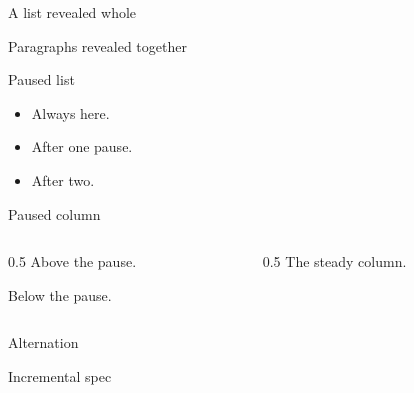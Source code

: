 \documentclass[aspectratio=169]{slides}
\begin{document}
\begin{frame}{A list revealed whole}
\end{frame}

\begin{frame}{Paragraphs revealed together}
\end{frame}

\begin{frame}{Paused list}
\begin{itemize}
\item Always here.
\pause
\item After one pause.
\pause
\item After two.
\end{itemize}
\end{frame}

\begin{frame}{Paused column}
\begin{columns}
\begin{column}{0.5\textwidth}
Above the pause.

\pause
Below the pause.
\end{column}
\begin{column}{0.5\textwidth}
The steady column.
\end{column}
\end{columns}
\end{frame}

\begin{frame}{Alternation}
\end{frame}

\begin{frame}{Incremental spec}
\end{frame}
\end{document}
